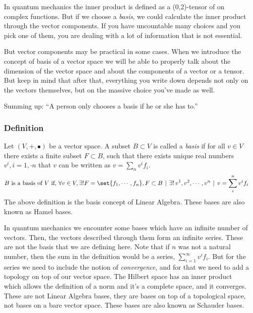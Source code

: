 In quantum mechanics the inner product is defined as a (0,2)-tensor of on complex functions.
But if we choose a \emph{basis}, we could calculate the inner product through the vector
components.
If you have uncountable many choices and you pick one of them, you are dealing with a lot of
information that is not essential.

But vector components may be practical in some cases. When we introduce the concept of basis of a
vector space we will be able to properly talk about the dimension of the vector space and about the
components of a vector or a tensor. But keep in mind that after that, everything you write down
depends not only on the vectors themselves, but on the massive choice you've made as well.

Summing up: ``A person only chooses a basis if he or she has to.''

\subsubsection{Definition}
Let $(V,+,\vysmblkcircle)$ be a vector space. A subset $B\subset V$ is called a \emph{basis} if
for all $v\in V$ there exists a finite subset $F\subset B$, such that there exists unique real
numbers $v^i, i=1,\cdot n$ that $v$ can be written as $v=\sum_n v^i f_i$.
{\small
\[
  B \text{ is a basis of } V \text{ if, }
  \forall v\in V, \exists! F=\set{f_1,\cdots,f_n}, F\subset B
  \hspace{.4em}|\hspace{.4em} \exists!\, v^1, v^2,\cdots, v^n
  \hspace{.4em}|\hspace{.4em} v=\sum_i^n v^i f_i
\]
}
The above definition is the basis concept of Linear Algebra. These bases are also known as
Hamel bases.

In quantum mechanics we encounter some bases which have an infinite number of vectors.
Then, the vectors described through them form an infinite series. These are not
the basis that we are defining here.
Note that if $n$ was not a natural number, then the sum in the definition would be a series,
$\sum_{i=1}^\infty v^i f_i$. But for the series we need to include the notion of
\emph{convergence}, and for that we need to add a topology on top of our vector space.
The Hilbert space has an inner product which allows the definition of a norm and it's a complete
space, and it converges. These are not Linear Algebra bases, they are bases on top of a topological
space, not bases on a bare vector space. These bases are also known as Schauder bases.

